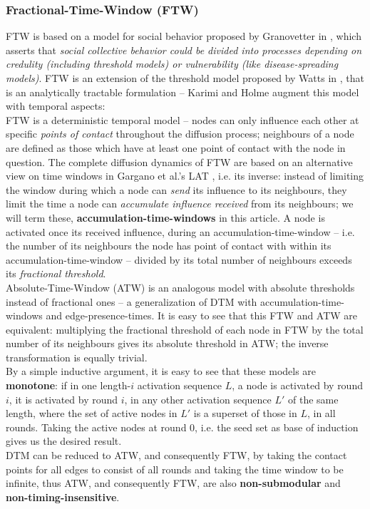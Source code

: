 \documentclass[twocolumn, 10pt]{article}
\begin{document}
\subsubsection{Fractional-Time-Window (FTW)}
FTW is based on a model for social behavior proposed by Granovetter in \cite{grano}, which asserts that \textit{social collective behavior could be divided into processes depending on credulity (including threshold models) or vulnerability (like disease-spreading models)}\cite{karimi}. FTW is an extension of the threshold model proposed by Watts in \cite{duncan}, that is an analytically tractable formulation -- Karimi and Holme augment this model with temporal aspects: \\
FTW is a deterministic temporal model -- nodes can only influence each other at specific \textit{points of contact} throughout the diffusion process; neighbours of a node are defined as those which have at least one point of contact with the node in question. The complete diffusion dynamics of FTW are based on an alternative view on time windows in Gargano et al.'s LAT \cite{gargano}, i.e. its inverse: instead of limiting the window during which a node can \textit{send} its influence to its neighbours, they limit the time a node can \textit{accumulate influence received} from its neighbours; we will term these, \textbf{accumulation-time-windows} in this article. A node is activated once its received influence, during an accumulation-time-window -- i.e. the number of its neighbours the node has point of contact with within its accumulation-time-window -- divided by its total number of neighbours exceeds its \textit{fractional threshold}. \\
Absolute-Time-Window (ATW) \cite{karimi} is an analogous model with absolute thresholds instead of fractional ones -- a generalization of DTM with accumulation-time-windows and edge-presence-times. It is easy to see that this FTW and ATW are equivalent: multiplying the fractional threshold of each node in FTW by the total number of its neighbours gives its absolute threshold in ATW; the inverse transformation is equally trivial. \\
By a simple inductive argument, it is easy to see that these models are \textbf{monotone}: if in one length-$i$ activation sequence $L$, a node is activated by round $i$, it is activated by round $i$, in any other activation sequence $L'$ of the same length, where the set of active nodes in $L'$ is a superset of those in $L$, in all rounds. Taking the active nodes at round $0$, i.e. the seed set as base of induction gives us the desired result. \\ 
DTM can be reduced to ATW, and consequently FTW, by taking the contact points for all edges to consist of all rounds and taking the time window to be infinite, thus ATW, and consequently FTW, are also \textbf{non-submodular} and \textbf{non-timing-insensitive}.
\end{document}
